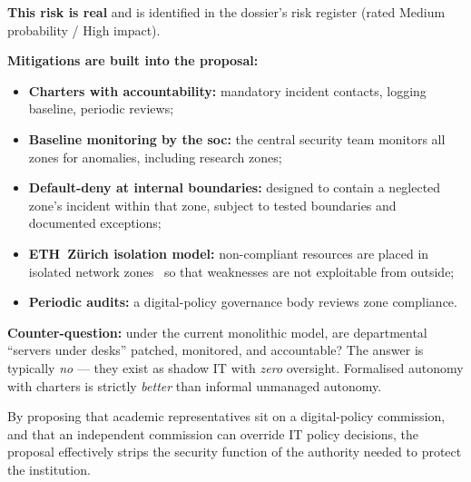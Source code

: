 \begin{answerbox}[Answer to Q2.2]
\textbf{This risk is real} and is identified in the dossier's risk register (rated Medium probability / High impact).

\medskip\noindent\textbf{Mitigations are built into the proposal:}
\begin{itemize}[nosep]
    \item \textbf{Charters with accountability:} mandatory incident contacts, logging baseline, periodic reviews;
    \item \textbf{Baseline monitoring by the \gls{soc}:} the central security team monitors all zones for anomalies, including research zones;
    \item \textbf{Default-deny at internal boundaries:} designed to contain a neglected zone's incident within that zone, subject to tested boundaries and documented exceptions;
    \item \textbf{ETH~Z\"urich isolation model:} non-compliant resources are placed in isolated network zones~\cite{eth-baseline} so that weaknesses are not exploitable from outside;
    \item \textbf{Periodic audits:} a digital-policy governance body reviews zone compliance.
\end{itemize}

\noindent\textbf{Counter-question:} under the current monolithic model, are departmental ``servers under desks'' patched, monitored, and accountable? The answer is typically \emph{no} --- they exist as shadow IT with \emph{zero} oversight. Formalised autonomy with charters is strictly \emph{better} than informal unmanaged autonomy.
\end{answerbox}

\bigskip

\begin{clarificationbox}
By proposing that academic representatives sit on a digital-policy commission, and that an independent commission can override IT policy decisions, the proposal effectively strips the security function of the authority needed to protect the institution.
\end{clarificationbox}


